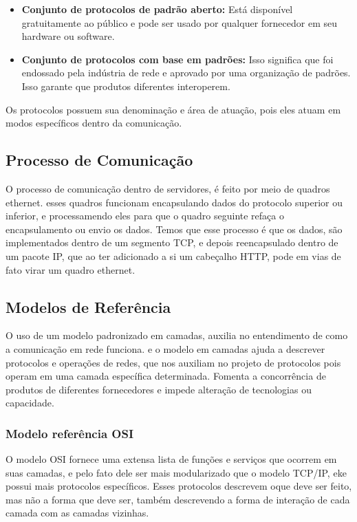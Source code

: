 \documentclass[12pt a4paper]{paper}
\begin{document}
\begin{itemize}
  \item \textbf{Conjunto de protocolos de padrão aberto: }Está disponível gratuitamente ao público e pode ser usado por qualquer fornecedor em seu hardware ou software. 

  \item \textbf{Conjunto de protocolos com base em padrões: }Isso significa que foi endossado pela indústria de rede e aprovado por uma organização de padrões. Isso garante que produtos diferentes interoperem.
\end{itemize}

Os protocolos possuem sua denominação e área de atuação, pois eles atuam em 
modos específicos dentro da comunicação.


\subsection{Processo de Comunicação} %
\label{sub:Processo de Comunicação}

O processo de comunicação dentro de servidores, é feito por meio de quadros ethernet. 
esses quadros funcionam encapsulando dados do protocolo superior ou inferior, e 
processamendo eles para que o quadro seguinte refaça o encapsulamento ou envio os dados. 
Temos que esse processo é que os dados, são implementados dentro de um segmento TCP,
e depois reencapsulado dentro de um pacote IP, que ao ter adicionado a si um 
cabeçalho HTTP, pode em vias de fato virar um quadro ethernet. 


\subsection{Modelos de Referência} %
\label{sub:Modelos de Referência}
O uso de um modelo padronizado em camadas, auxilia no entendimento de como a 
comunicação em rede funciona. e o modelo em camadas ajuda a descrever protocolos e 
operações de redes, que nos auxiliam no projeto de protocolos pois operam em uma 
camada específica determinada. Fomenta a concorrência de produtos de diferentes 
fornecedores e impede alteração de tecnologias ou capacidade. 

\subsubsection{Modelo referência OSI} %
\label{sec:Modelo referência OSI}
O modelo OSI fornece uma extensa lista de funções e serviços que ocorrem em suas 
camadas, e pelo fato dele ser mais modularizado que o modelo TCP/IP, eke possui mais 
protocolos específicos. Esses protocolos descrevem oque deve ser feito, mas não a forma
que deve ser, também descrevendo a forma de interação de cada camada com as camadas 
vizinhas.
\end{document}
